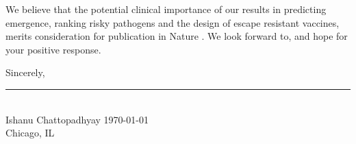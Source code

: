 \documentclass[9pt,onecolumn,compsoc]{IEEEtran}
\newcommand{\Space}{\vspace{10pt}}
\def\JNAME{Proceedings of the National Academy of Sciences \xspace}
\def\JNAME{Nature \xspace}
\begin{document}
We believe that  the potential  clinical importance   of our results in predicting emergence, ranking risky pathogens and the design of escape resistant vaccines,   merits consideration  for  publication in \JNAME. We look forward to, and  hope for your positive  response.
\Space
\vspace{-14pt}

Sincerely,
\vspace{-24pt}

% 
\begin{flushleft}
\vspace{-30pt}

\rule{2.5in}{1pt}\\
{\fontsize{10}{10}\selectfont Ishanu Chattopadhyay}
\hfill \today\\
Chicago, IL
\end{flushleft}

\end{document}
